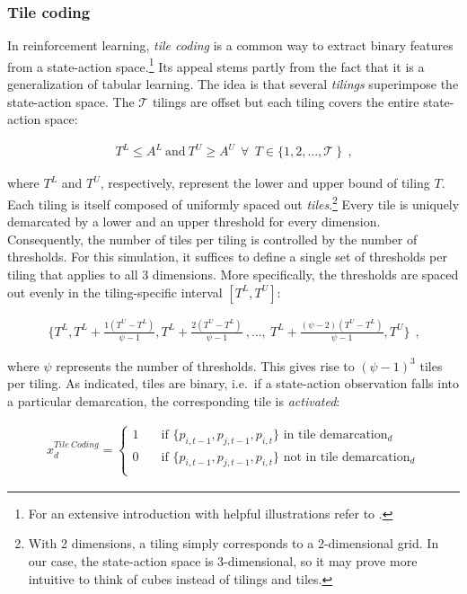 \subsubsection{Tile coding}\label{tile_coding}
In reinforcement learning, \emph{tile coding} is a common way to extract binary features from a state-action space.\footnote{For an extensive introduction with helpful illustrations refer to \textcite[pp.217-221]{sutton_reinforcement_2018}.} Its appeal stems partly from the fact that it is a generalization of tabular learning. The idea is that several \emph{tilings} superimpose the state-action space. The $\mathcal{T}$ tilings are offset but each tiling covers the entire state-action space:

\begin{gather}
	 T^L \leq A^L  ~ \text{and} ~ T^U \geq A^U ~~ \forall  ~~ T \in \{1, 2, ..., \mathcal{T} ~ \} ~~ \text{,}
\end{gather}

where $T^L$ and $T^U$, respectively, represent the lower and upper bound of tiling $T$. Each tiling is itself composed of uniformly spaced out \emph{tiles}.\footnote{With 2 dimensions, a tiling simply corresponds to a 2-dimensional grid. In our case, the state-action space is 3-dimensional, so it may prove more intuitive to think of cubes instead of tilings and tiles.} Every tile is uniquely demarcated by a lower and an upper threshold for every dimension. Consequently, the number of tiles per tiling is controlled by the number of thresholds. For this simulation, it suffices to define a single set of thresholds per tiling that applies to all 3 dimensions. More specifically, the thresholds are spaced out evenly in the tiling-specific interval $[T^L, T^U]$:

\begin{gather}
\{
T^L,
T^L + \frac{1(T^U - T^L)}{\psi - 1},
T^L + \frac{2(T^U - T^L)}{\psi - 1}~ , ... , ~
T^L + \frac{(\psi-2)(T^U - T^L)}{\psi - 1},
T^U\} ~~ \text{,}
\end{gather}

where $\psi$ represents the number of thresholds. This gives rise to $(\psi-1)^3$ tiles per tiling. As indicated, tiles are binary, i.e.\ if a state-action observation falls into a particular demarcation, the corresponding tile is \emph{activated}:

\begin{gather}\label{tile_activation}
x_d^{Tile ~ Coding} = \begin{cases}
1 & \quad \text{if } \{p_{i, t-1}, p_{j, t-1}, p_{i, t}\} \text{~in tile demarcation}_d  \\
0 & \quad \text{if } \{p_{i, t-1}, p_{j, t-1}, p_{i, t}\} \text{~not in tile demarcation}_d \\ \end{cases} 
\end{gather}

